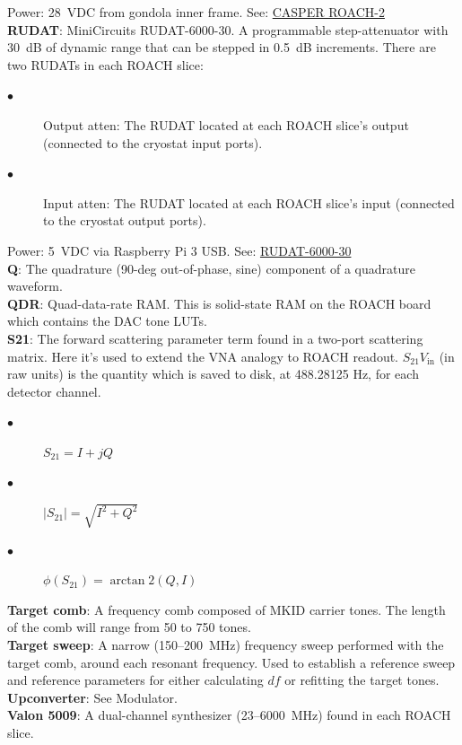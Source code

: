 Power: 28~VDC from gondola inner frame.
See: \href{https://casper.ssl.berkeley.edu/wiki/ROACH-2_Revision_2}{CASPER ROACH-2}\\
\textbf{RUDAT}: MiniCircuits RUDAT-6000-30. A programmable step-attenuator with 30~dB of dynamic range that can be stepped in 0.5~dB increments. There are two RUDATs in each ROACH slice:
\begin{description}
  \item[$\bullet$] Output atten: The RUDAT located at each ROACH slice’s output (connected to the cryostat input ports).
  \item[$\bullet$] Input atten: The RUDAT located at each ROACH slice’s input (connected to the cryostat output ports).
\end{description}
Power: 5~VDC via Raspberry Pi 3 USB\@.
See: \href{https://www.minicircuits.com/pdfs/RUDAT-6000-30.pdf}{RUDAT-6000-30}\\
\textbf{Q}: The quadrature (90-deg out-of-phase, sine) component of a quadrature waveform.\\
\textbf{QDR}: Quad-data-rate RAM\@. This is solid-state RAM on the ROACH board which contains the DAC tone LUTs.\\
\textbf{S21}: The forward scattering parameter term found in a two-port scattering matrix. Here it’s used to extend the VNA analogy to ROACH readout. $S_{21}V_{\mathrm{in}}$ (in raw units) is the quantity which is saved to disk, at 488.28125 Hz, for each detector channel.
\begin{description}
  \item[$\bullet$] $S_{21} = I + jQ$
  \item[$\bullet$] $\left|S_{21}\right| = \sqrt{I^{2} + Q^{2}}$
  \item[$\bullet$] $\phi(S_{21}) = \arctan2(Q,I)$
\end{description}
\textbf{Target comb}: A frequency comb composed of MKID carrier tones. The length of the comb will range from 50 to 750 tones.\\
\textbf{Target sweep}: A narrow (150--200~MHz) frequency sweep performed with the target comb, around each resonant frequency. Used to establish a reference sweep and reference parameters for either calculating $df$ or refitting the target tones.
\textbf{Upconverter}: See Modulator.\\
\textbf{Valon 5009}: A dual-channel synthesizer (23--6000~MHz) found in each ROACH slice.\\
